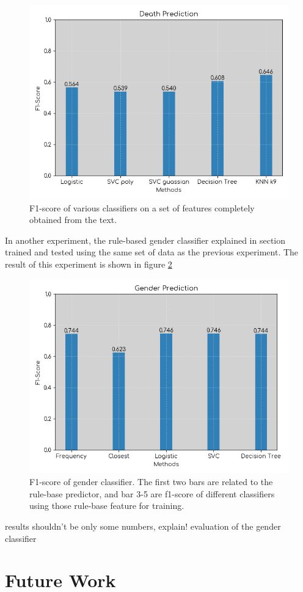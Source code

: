 \documentclass[letterpaper]{article}
\begin{document}
\begin{figure}
	\centering
	\includegraphics[scale=.60]{f1_scores.png}
	\caption{F1-score of various classifiers on a set of features completely obtained from the text.}
	\label{fig:f1}
\end{figure}

In another experiment, the rule-based gender classifier explained in section  trained and tested using the same set of data as the previous experiment. The result of this experiment is shown in figure \ref{fig:gender}

\begin{figure}
	\centering
	\includegraphics[scale=.60]{gender_prediction.png}
	\caption{F1-score of gender classifier. The first two bars are related to the rule-base predictor, and bar 3-5 are f1-score of different classifiers using those rule-base feature for training.}
	\label{fig:gender}
\end{figure}


results shouldn't be only some numbers, explain!
evaluation of the gender classifier





\section{Future Work}





\end{document}
